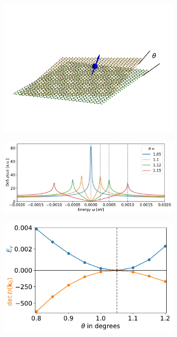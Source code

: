 \begin{figure}[t!]
	\begin{subfigure}[b]{0.275\linewidth}
		\centering
		\includegraphics[width=1.1\linewidth]{figures/chapter2/Kondo_impurity_on_twisted_bilayer_3.pdf}
		\caption{\label{fig:schematic}}
	\end{subfigure}
	\begin{subfigure}[b]{0.400\linewidth}
		\centering
		\includegraphics[width=\linewidth]{figures/chapter2/BiggerFontHistogramDOS.pdf}
		\caption{{\label{fig:HistogramDOS}}}
	\end{subfigure}
	\begin{subfigure}[b]{0.300\linewidth}
		\centering
		\includegraphics[width=\linewidth]{figures/chapter2/ShowHigherOrder.pdf}

\end{subfigure}
\end{figure}
